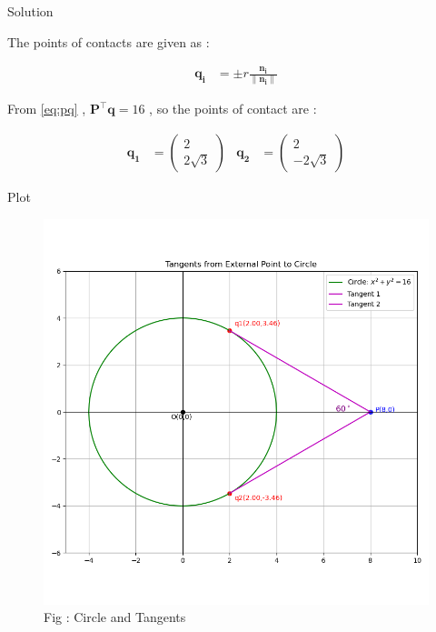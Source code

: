 \documentclass{beamer}
\numberwithin{equation}{section}
\theoremstyle{remark}
\providecommand{\norm}[1]{\lVert#1\rVert}
\newcommand{\myvec}[1]{\ensuremath{\begin{pmatrix}#1\end{pmatrix}}}
\let\vec\mathbf
\begin{document}
\begin{frame}{Solution}

The points of contacts are given as :

\begin{align}
  \vec{q_i} &= \pm r \frac{\vec{n_i}}{\norm{\vec{n_i}}}
\end{align}

From \eqref{eq:pq} , $\vec{P}^\top\vec{q}=16$ , so the points of contact are :

\begin{align}
  \vec{q_1} &= \myvec{2\\2\sqrt{3}} & \vec{q_2} &= \myvec{2\\-2\sqrt{3}}
\end{align}

\end{frame}

\begin{frame}{Plot}

\begin{figure}[h!]
  \centering
  \includegraphics[width=0.6\columnwidth]{figs/circle_tangents.png} 
   \caption*{Fig : Circle and Tangents}
  \label{Fig1}
\end{figure}

\end{frame}
\end{document}

